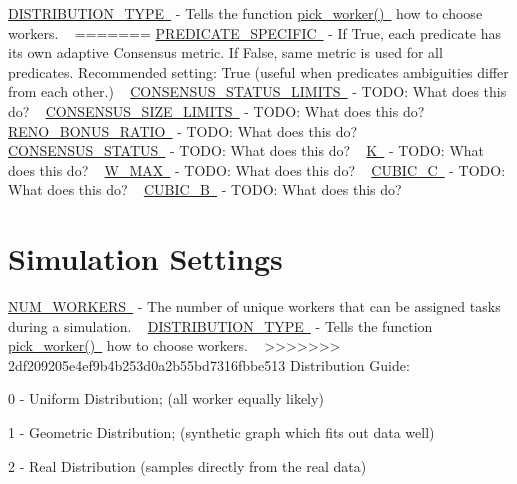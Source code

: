  \mbox{\hyperlink{namespacedynamicfilterapp_1_1toggles_aceed21fa0675802d2f756c7da43cb049}{D\+I\+S\+T\+R\+I\+B\+U\+T\+I\+O\+N\+\_\+\+T\+Y\+PE }} -\/ Tells the function \mbox{\hyperlink{}{pick\+\_\+worker() }} how to choose workers. ~\newline
=======
\mbox{\hyperlink{}{P\+R\+E\+D\+I\+C\+A\+T\+E\+\_\+\+S\+P\+E\+C\+I\+F\+IC }} -\/ If True, each predicate has its own adaptive Consensus metric. If False, same metric is used for all predicates. Recommended setting\+: True (useful when predicates\textquotesingle{} ambiguities differ from each other.) ~\newline
 \mbox{\hyperlink{}{C\+O\+N\+S\+E\+N\+S\+U\+S\+\_\+\+S\+T\+A\+T\+U\+S\+\_\+\+L\+I\+M\+I\+TS }} -\/ T\+O\+DO\+: What does this do? ~\newline
 \mbox{\hyperlink{}{C\+O\+N\+S\+E\+N\+S\+U\+S\+\_\+\+S\+I\+Z\+E\+\_\+\+L\+I\+M\+I\+TS }} -\/ T\+O\+DO\+: What does this do? ~\newline
 \mbox{\hyperlink{}{R\+E\+N\+O\+\_\+\+B\+O\+N\+U\+S\+\_\+\+R\+A\+T\+IO }} -\/ T\+O\+DO\+: What does this do? ~\newline
 \mbox{\hyperlink{}{C\+O\+N\+S\+E\+N\+S\+U\+S\+\_\+\+S\+T\+A\+T\+US }} -\/ T\+O\+DO\+: What does this do? ~\newline
 \mbox{\hyperlink{}{K }} -\/ T\+O\+DO\+: What does this do? ~\newline
 \mbox{\hyperlink{}{W\+\_\+\+M\+AX }} -\/ T\+O\+DO\+: What does this do? ~\newline
 \mbox{\hyperlink{}{C\+U\+B\+I\+C\+\_\+C }} -\/ T\+O\+DO\+: What does this do? ~\newline
 \mbox{\hyperlink{}{C\+U\+B\+I\+C\+\_\+B }} -\/ T\+O\+DO\+: What does this do? ~\newline
 \hypertarget{toggles_sim}{}\section{Simulation Settings}\label{toggles_sim}
\mbox{\hyperlink{}{N\+U\+M\+\_\+\+W\+O\+R\+K\+E\+RS }} -\/ The number of unique workers that can be assigned tasks during a simulation. ~\newline
 \mbox{\hyperlink{}{D\+I\+S\+T\+R\+I\+B\+U\+T\+I\+O\+N\+\_\+\+T\+Y\+PE }} -\/ Tells the function \mbox{\hyperlink{}{pick\+\_\+worker() }} how to choose workers. ~\newline
>>>>>>> 2df209205e4ef9b4b253d0a2b55bd7316fbbe513
Distribution Guide\+:
\begin{DoxyItemize}
\item 0 -\/ Uniform Distribution; (all worker equally likely)
\item 1 -\/ Geometric Distribution; (synthetic graph which fits out data well)
\item 2 -\/ Real Distribution (samples directly from the real data)
\end{DoxyItemize}


